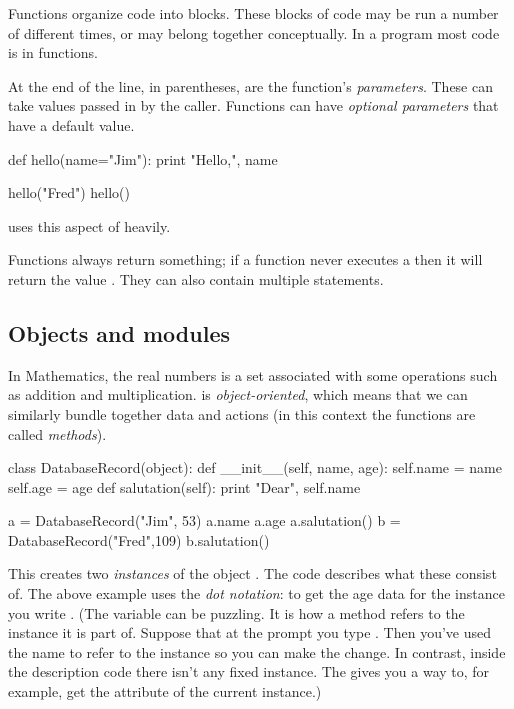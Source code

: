 Functions organize code into blocks. 
These blocks of code may be 
run a number of different times, or may belong together conceptually. 
In a \python{} program most code is in functions. 

At the end of the  line, in parentheses, are
the function's \textit{parameters}. 
These can take values 
passed in by the caller.
Functions can have \textit{optional parameters} that have a default value.
\begin{pythonoutput}
def hello(name="Jim"):
    print "Hello,", name

hello("Fred")
hello()
\end{pythonoutput}
\noindent
\Sage{} uses this aspect of \python{} heavily.

Functions always return something; 
if a function never executes a  then it will
return the value .
They can also contain multiple  statements.




\subsection{Objects and modules}
In Mathematics, the real numbers is a set associated with some operations
such as addition and multiplication.
\python{} is \textit{object-oriented}, which means that we can similarly bundle
together data and actions (in this context the functions are called 
\textit{methods}).
\begin{pythonoutput}
class DatabaseRecord(object):
    def __init__(self, name, age):
        self.name = name
        self.age = age
    def salutation(self):
        print "Dear", self.name

a = DatabaseRecord("Jim", 53)
a.name
a.age
a.salutation()
b = DatabaseRecord("Fred",109)
b.salutation()
\end{pythonoutput}
\noindent
This creates two \textit{instances} of the object 
.
The  code describes what these consist of.
The above example uses the \textit{dot notation}:
to get the age data for the instance 
you write 
.
(The \protect{} variable 
can  be puzzling.
It is how a method refers to the instance it is part of.
Suppose that at the prompt you type .
Then you've used the name  
to refer to the instance so you can
make the change.
In contrast,
inside the  description code there isn't any fixed instance. 
The  gives you a way to, for example, 
get the  attribute
of the current instance.)

